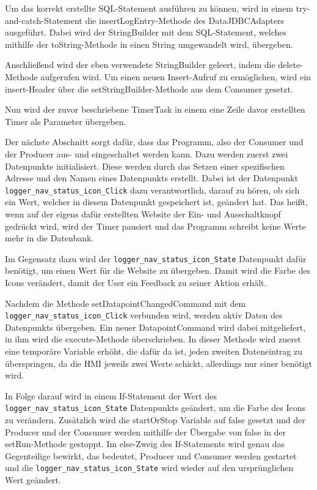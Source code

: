 Um das korrekt erstellte SQL-Statement ausführen zu können, wird in einem try-and-catch-Statement die insertLogEntry-Methode des DataJDBCAdapters ausgeführt. Dabei wird der StringBuilder mit dem SQL-Statement, welches mithilfe der toString-Methode in einen String umgewandelt wird, übergeben.
 
Anschließend wird der eben verwendete StringBuilder geleert, indem die delete-Methode aufgerufen wird. Um einen neuen Insert-Aufruf zu ermöglichen, wird ein insert-Header über die setStringBuilder-Methode aus dem Consumer gesetzt.
 
Nun wird der zuvor beschriebene TimerTask in einem eine Zeile davor erstellten Timer als Parameter übergeben.

Der nächste Abschnitt sorgt dafür, dass das Programm, also der Consumer und der Producer aus- und eingeschaltet werden kann. Dazu werden zuerst zwei Datenpunkte initialisiert. Diese werden durch das Setzen einer spezifischen Adresse und den Namen eines Datenpunkts erstellt. Dabei ist der Datenpunkt \texttt{logger\_nav\_status\_icon\_Click} dazu verantwortlich, darauf zu hören, ob sich ein Wert, welcher in diesem Datenpunkt gespeichert ist, geändert hat. Das heißt, wenn auf der eigens dafür erstellten Website der Ein- und Ausschaltknopf gedrückt wird, wird der Timer pausiert und das Programm schreibt keine Werte mehr in die Datenbank.

Im Gegensatz dazu wird der \texttt{logger\_nav\_status\_icon\_State} Datenpunkt dafür benötigt, um einen Wert für die Website zu übergeben. Damit wird die Farbe des Icons verändert, damit der User ein Feedback zu seiner Aktion erhält.

Nachdem die Methode setDatapointChangedCommand mit dem \\ \texttt{logger\_nav\_status\_icon\_Click} verbunden wird, werden aktiv Daten des Datenpunkts übergeben. Ein neuer DatapointCommand wird dabei mitgeliefert, in ihm wird die execute-Methode überschrieben. In dieser Methode wird zuerst eine temporäre Variable erhöht, die dafür da ist, jeden zweiten Dateneintrag zu überspringen, da die HMI jeweils zwei Werte schickt, allerdings nur einer benötigt wird.

In Folge darauf wird in einem If-Statement der Wert des \texttt{logger\_nav\_status\_icon\_State} Datenpunkts geändert, um die Farbe des Icons zu verändern. Zusätzlich wird die startOrStop Variable auf false gesetzt und der Producer und der Consumer werden mithilfe der Übergabe von \glq false\grq{} in der setRun-Methode gestoppt. Im else-Zweig des If-Statements wird genau das Gegenteilige bewirkt, das bedeutet, Producer und Consumer werden gestartet und die \texttt{logger\_nav\_status\_icon\_State} wird wieder auf den ursprünglichen Wert geändert.
 

